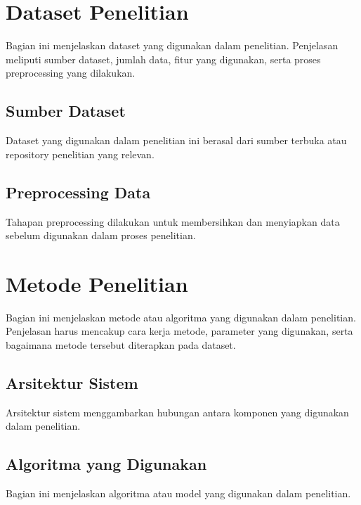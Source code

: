 \section{Dataset Penelitian}

Bagian ini menjelaskan dataset yang digunakan dalam penelitian. Penjelasan
meliputi sumber dataset, jumlah data, fitur yang digunakan, serta proses
preprocessing yang dilakukan.

\subsection{Sumber Dataset}

Dataset yang digunakan dalam penelitian ini berasal dari sumber terbuka
atau repository penelitian yang relevan.

\subsection{Preprocessing Data}

Tahapan preprocessing dilakukan untuk membersihkan dan menyiapkan data
sebelum digunakan dalam proses penelitian.

\section{Metode Penelitian}

Bagian ini menjelaskan metode atau algoritma yang digunakan dalam penelitian.
Penjelasan harus mencakup cara kerja metode, parameter yang digunakan,
serta bagaimana metode tersebut diterapkan pada dataset.

\subsection{Arsitektur Sistem}

Arsitektur sistem menggambarkan hubungan antara komponen yang digunakan
dalam penelitian.

\subsection{Algoritma yang Digunakan}

Bagian ini menjelaskan algoritma atau model yang digunakan dalam penelitian.

